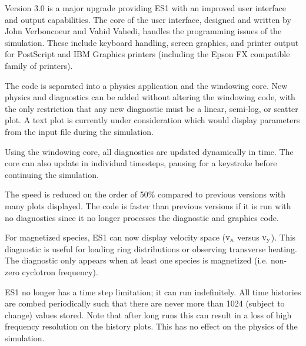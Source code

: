 \begin{section}
\begin{subsection}
\begin{subsubsection}
      Version 3.0 is a major upgrade providing ES1 with an improved user
      interface and output capabilities.  The core of the user interface,
      designed and written by John Verboncoeur and Vahid Vahedi, handles the
      programming issues of the simulation.  These include keyboard handling,
      screen graphics, and printer output for PostScript and IBM Graphics
      printers (including the Epson FX compatible family of printers).
\vspace{.2in}

\noindent
      The code is separated into a physics application and the windowing core.
      New physics and diagnostics can be added without altering the windowing
      code, with the only restriction that any new diagnostic must be a linear,
      semi-log, or scatter plot.  A text plot is currently under consideration
      which would display parameters from the input file during the simulation.
\vspace{.2in}

\noindent
      Using the windowing core, all diagnostics are updated dynamically in
      time.  The core can also update in individual timesteps, pausing for a
      keystroke before continuing the simulation.
\vspace{.2in}

\noindent
      The speed is reduced on the order of 50\% compared to 
      previous versions
      with many plots displayed.  The code is faster than previous versions if
      it is run with no diagnostics since it no longer processes the diagnostic
      and graphics code.
\vspace{.2in}

\noindent
      For magnetized species, ES1 can now display velocity space (${\rm v_{x}}$ 
	versus
      ${\rm v_{y}}$).  This diagnostic is useful for loading ring distributions or
      observing transverse heating.  The diagnostic only appears when at least
      one species is magnetized (i.e. non-zero cyclotron frequency).
\vspace{.2in}

\noindent
      ES1 no longer has a time step limitation; it can run indefinitely.  All
      time histories are combed periodically such that there are never more
      than 1024 (subject to change) values stored.  Note that after long runs
      this can result in a loss of high frequency resolution on the history
      plots.  This has no effect on the physics of the simulation.
\vspace{.2in}


\end{subsubsection}
\end{subsection}
\end{section}
